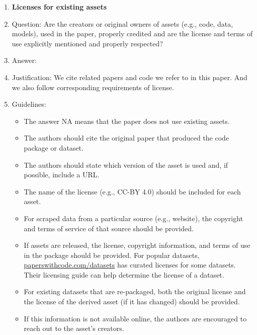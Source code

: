 \documentclass{article}
\begin{document}
\begin{enumerate}
\item {\bf Licenses for existing assets}
    \item[] Question: Are the creators or original owners of assets (e.g., code, data, models), used in the paper, properly credited and are the license and terms of use explicitly mentioned and properly respected?
    \item[] Answer: \answerYes{} %
    \item[] Justification: We cite related papers and code we refer to in this paper. And we also follow corresponding requirements of license.
    \item[] Guidelines:
    \begin{itemize}
        \item The answer NA means that the paper does not use existing assets.
        \item The authors should cite the original paper that produced the code package or dataset.
        \item The authors should state which version of the asset is used and, if possible, include a URL.
        \item The name of the license (e.g., CC-BY 4.0) should be included for each asset.
        \item For scraped data from a particular source (e.g., website), the copyright and terms of service of that source should be provided.
        \item If assets are released, the license, copyright information, and terms of use in the package should be provided. For popular datasets, \url{paperswithcode.com/datasets} has curated licenses for some datasets. Their licensing guide can help determine the license of a dataset.
        \item For existing datasets that are re-packaged, both the original license and the license of the derived asset (if it has changed) should be provided.
        \item If this information is not available online, the authors are encouraged to reach out to the asset's creators.
    \end{itemize}


\end{enumerate}
\end{document}
